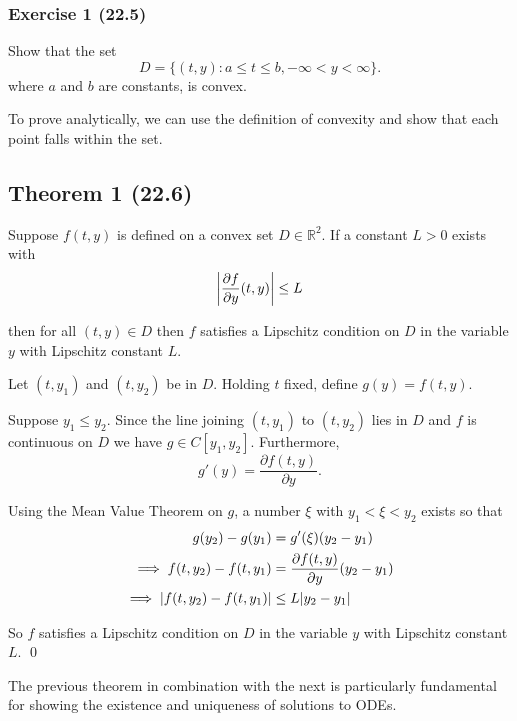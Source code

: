 \subsubsection{Exercise 1 (22.5)}

Show that the set
\begin{equation*}
  D = \{(t,y):a\leq t\leq b, -\infty < y < \infty\}
.\end{equation*}
where $a$ and $b$ are constants, is convex.

To prove analytically, we can use the definition of convexity and show that each
point falls within the set.

\subsection{Theorem 1 (22.6)}

Suppose $f(t,y)$ is defined on a convex set $D\in \mathbb{R}^2$. If a constant
$L>0$ exists with
\begin{equation*}
  \abs{\frac{\partial f}{\partial y}(t,y)} \leq L
\end{equation*}

\noindent
then for all $(t,y) \in D$ then $f$ satisfies a Lipschitz condition on $D$ in
the variable $y$ with Lipschitz constant $L$.

\proof Let $(t, y_1)$ and $(t, y_2)$ be in $D$. Holding $t$ fixed, define 
$g(y) = f(t, y)$.

Suppose $y_1 \leq y_2$. Since the line joining $(t, y_1)$ to $(t, y_2)$ lies in
$D$ and $f$ is continuous on $D$ we have $g \in C[y_1, y_2]$. Furthermore,
\[
g'(y) = \frac{\partial f(t, y)}{\partial y}.
\]

Using the Mean Value Theorem on $g$, a number $\xi$ with $y_1 < \xi < y_2$ 
exists so that
\begin{align*}
  g(y_2) - g(y_1) &= g'(\xi)(y_2 - y_1) \\
  \implies f(t, y_2) - f(t, y_1) &= \frac{\partial f(t, y)}{\partial y}(y_2 - y_1) \\
  \implies \abs{f(t, y_2) - f(t, y_1)} &\leq L \abs{y_2 - y_1} \\
\end{align*}

So $f$ satisfies a Lipschitz condition on $D$ in the variable $y$ with Lipschitz
constant $L$. \qed

The previous theorem in combination with the next is particularly fundamental
for showing the existence and uniqueness of solutions to ODEs.

